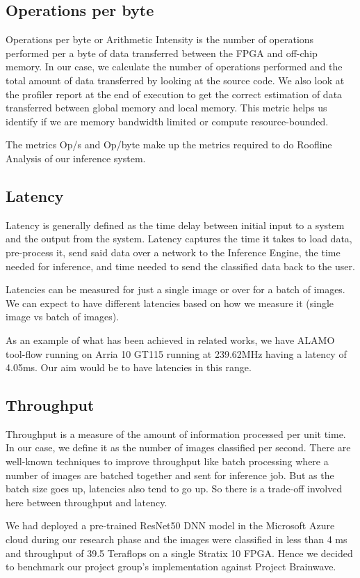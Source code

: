 \documentclass[titlepage]{report}
\begin{document}
\subsection{Operations per byte}
Operations per byte or Arithmetic Intensity is the number of operations performed per a byte of data transferred between the FPGA and off-chip memory.  
In our case, we calculate the number of operations performed and the total amount of data transferred by looking at the source code. We also look at the profiler report at the end of execution to get the correct estimation of data transferred between global memory and local memory.  
This metric helps us identify if we are memory bandwidth limited or compute resource-bounded.  

The metrics Op/s and Op/byte make up the metrics required to do Roofline Analysis of our inference system.  


\subsection{Latency}
Latency is generally defined as the time delay between initial input to a system and the output from the system. Latency captures the time it takes to load data, pre-process it, send said data over a network to the Inference Engine, the time needed for inference, and time needed to send the classified data back to the user.   

Latencies can be measured for just a single image or over for a batch of images. We can expect to have different latencies based on how we measure it (single image vs batch of images).  

As an example of what has been achieved in related works, we have ALAMO tool-flow running on Arria 10 GT115 running at 239.62MHz having a latency of 4.05ms.
Our aim would be to have latencies in this range.

\subsection{Throughput}
Throughput is a measure of the amount of information processed per unit time. In our case, we define it as the number of images classified per second.  There are well-known techniques to improve throughput like batch processing where a number of images are batched together and sent for inference job. 
But as the batch size goes up, latencies also tend to go up. So there is a trade-off involved here between throughput and latency.  \par
We had deployed a pre-trained ResNet50 DNN model in the Microsoft Azure cloud during our research phase and the images were classified in less than 4 ms and throughput of 39.5 Teraflops on a single Stratix 10 FPGA. Hence we decided to benchmark our project group's implementation against Project Brainwave.
\end{document}
